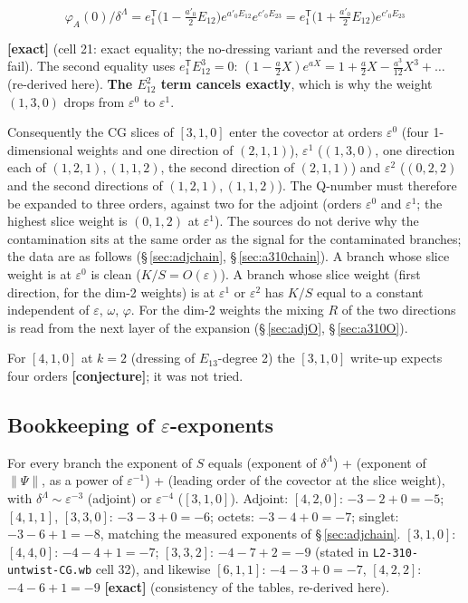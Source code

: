 \documentclass[10pt]{article}
\newcommand{\nb}[1]{\texttt{#1}}
\begin{document}
\[
\varphi_A(0)/\delta^\Lambda=e_1^{\mathsf T}\bigl(1-\tfrac{a'_0}{2}E_{12}\bigr)e^{a'_0E_{12}}e^{c'_0E_{23}}=e_1^{\mathsf T}\bigl(1+\tfrac{a'_0}{2}E_{12}\bigr)e^{c'_0E_{23}}
\]

\textbf{[exact]} (cell 21: exact equality; the no-dressing variant and the reversed order fail). The second equality uses $e_1^{\mathsf T}E_{12}^3=0$: $(1-\frac a2X)e^{aX}=1+\frac a2X-\frac{a^3}{12}X^3+\dots$ (re-derived here). \textbf{The $E_{12}^2$ term cancels exactly}, which is why the weight $(1,3,0)$ drops from $\varepsilon^0$ to $\varepsilon^1$.

Consequently the CG slices of $[3,1,0]$ enter the covector at orders $\varepsilon^0$ (four 1-dimensional weights and one direction of $(2,1,1)$), $\varepsilon^1$ ($(1,3,0)$, one direction each of $(1,2,1),(1,1,2)$, the second direction of $(2,1,1)$) and $\varepsilon^2$ ($(0,2,2)$ and the second directions of $(1,2,1),(1,1,2)$). The Q-number must therefore be expanded to three orders, against two for the adjoint (orders $\varepsilon^0$ and $\varepsilon^1$; the highest slice weight is $(0,1,2)$ at $\varepsilon^1$). The sources do not derive why the contamination sits at the same order as the signal for the contaminated branches; the data are as follows (\S\,\ref{sec:adjchain}, \S\,\ref{sec:a310chain}). A branch whose slice weight is at $\varepsilon^0$ is clean ($K/S=O(\varepsilon)$). A branch whose slice weight (first direction, for the dim-2 weights) is at $\varepsilon^1$ or $\varepsilon^2$ has $K/S$ equal to a constant independent of $\varepsilon$, $\omega$, $\varphi$. For the dim-2 weights the mixing $R$ of the two directions is read from the next layer of the expansion (\S\,\ref{sec:adjO}, \S\,\ref{sec:a310O}).

For $[4,1,0]$ at $k=2$ (dressing of $E_{13}$-degree 2) the $[3,1,0]$ write-up expects four orders \textbf{[conjecture]}; it was not tried.

\subsection{Bookkeeping of $\varepsilon$-exponents}\label{sec:bookkeeping}

For every branch the exponent of $S$ equals (exponent of $\delta^\Lambda$) + (exponent of $\|\Psi\|$, as a power of $\varepsilon^{-1}$) + (leading order of the covector at the slice weight), with $\delta^\Lambda\sim\varepsilon^{-3}$ (adjoint) or $\varepsilon^{-4}$ ($[3,1,0]$). Adjoint: $[4,2,0]$: $-3-2+0=-5$; $[4,1,1]$, $[3,3,0]$: $-3-3+0=-6$; octets: $-3-4+0=-7$; singlet: $-3-6+1=-8$, matching the measured exponents of \S\,\ref{sec:adjchain}. $[3,1,0]$: $[4,4,0]$: $-4-4+1=-7$; $[3,3,2]$: $-4-7+2=-9$ (stated in \nb{L2-\allowbreak{}310-\allowbreak{}untwist-\allowbreak{}CG.\allowbreak{}wb} cell 32), and likewise $[6,1,1]$: $-4-3+0=-7$, $[4,2,2]$: $-4-6+1=-9$ \textbf{[exact]} (consistency of the tables, re-derived here).
\end{document}
